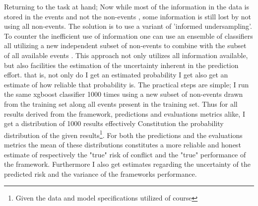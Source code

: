 \documentclass[a4paper]{article}
\begin{document}
Returning to the task at hand; Now while most of the information in the data is stored in the events and not the non-events \cite[139]{King_Zeng_2001}, some information is still lost by not using all non-events. The solution is to use a variant of 'informed undersampling'. To counter the inefficient use of information one can use an ensemble of classifiers all utilizing a new independent subset of non-events to combine with the subset of all available events \cite[1267]{He_2008}. This approach not only utilizes all information available, but also facilities the estimation of the uncertainty inherent in the prediction effort. that is, not only do I get an estimated probability I get also get an estimate of how reliable that probability is. The practical steps are simple; I run the same xgboost classifier 1000 times using a new subset of non-events drawn from the training set along all events present in the training set. Thus for all results derived from the framework,  predictions and evaluations metrics alike, I get a distribution of 1000 results effectively Constitution the probability distribution of the given results\footnote{Given the data and model specifications utilized of course}. For both the predictions and the evaluations metrics the mean of these distributions constitutes a more reliable and honest estimate of respectively the "true" risk of conflict and the "true" performance of the framework. Furthermore I also get estimates regarding the uncertainty of the predicted risk and the variance of the frameworks performance.\par


\cite{He_2008}
\cite{King_Zeng_2001} %



\end{document}
